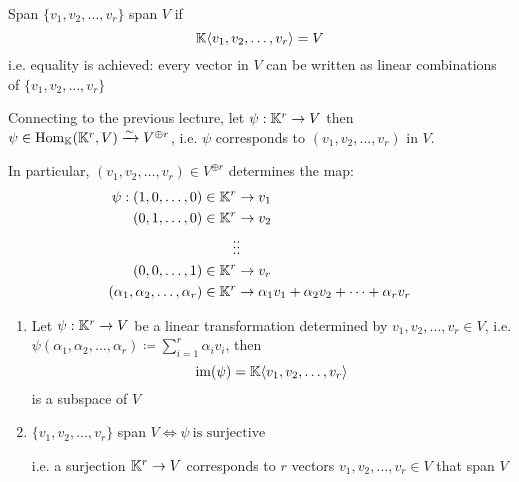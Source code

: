 

\begin{definition} {Span}
    \(\{v_1, v_2, \dots, v_r\}\) span \(V\) if \[
        \mathbb{K}\langle v_1, v_2, \dots, v_r \rangle = V
    \]
    i.e. equality is achieved: every vector in \(V\) can be written as linear combinations of \(\{v_1, v_2, \dots, v_r\}\)
\end{definition}

Connecting to the previous lecture, let \(\psi: \mathbb{K}^r \to V\) then \(\psi \in \mathrm{Hom}_{\mathbb{K}}(\mathbb{K}^r, V) \xrightarrow{\sim} V^{\oplus r}\), i.e. \(\psi\) corresponds to \((v_1, v_2, \dots, v_r)\) in \(V\).

In particular, \((v_1, v_2, \dots, v_r) \in V^{\oplus r}\) determines the map:
\begin{align*}
    \psi: (1, 0, \dots, 0) \in \mathbb{K}^r                & \to v_1                                             \\
    (0, 1, \dots, 0) \in \mathbb{K}^r                      & \to v_2                                             \\
    \vdots                                           & \vdots                                              \\
    (0, 0, \dots, 1) \in \mathbb{K}^r                      & \to v_r                                             \\
    (\alpha_1, \alpha_2, \dots, \alpha_r) \in \mathbb{K}^r & \to \alpha_1v_1 + \alpha_2v_2 + \dots + \alpha_rv_r
\end{align*}

\begin{lemma}
    \hfill
    \begin{enumerate}
        \item Let \(\psi: \mathbb{K}^r \to V\) be a linear transformation determined by \(v_1, v_2, \dots, v_r \in V\), i.e. \(\psi(\alpha_1, \alpha_2, \dots, \alpha_r) \coloneqq \sum_{i=1}^r \alpha_iv_i\), then \[
                  \mathrm{im}(\psi) = \mathbb{K}\langle v_1, v_2, \dots, v_r \rangle
              \] is a subspace of \(V\)
        \item \(\{v_1, v_2, \dots, v_r\}\) span \(V \Leftrightarrow \psi \:\text{is surjective}\: \)

              i.e. a surjection \(\mathbb{K}^r \to V\) corresponds to \(r\) vectors \(v_1, v_2, \dots, v_r \in V\) that span \(V\)
    \end{enumerate}
\end{lemma}

